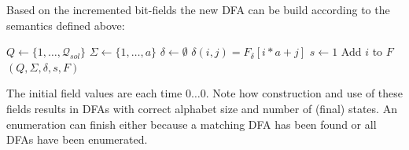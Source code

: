 Based on the incremented bit-fields the new DFA can be build according to the semantics defined above:
\vspace{0.2cm}
\begin{algorithmic}[1]
	\State $Q \gets \{1, \ldots, \mathcal{Q}_{sol}\}$
	\State $\Sigma \gets \{1, \ldots, a\}$
	\State $\delta \gets \emptyset$
            \State $\delta(i, j) = F_\delta[i * a + j]$
		\EndFor
	\EndFor
	\State $s \gets 1$
			\State Add $i$ to $F$
		\EndIf
	\EndFor
	\State \Return $(Q, \Sigma, \delta, s, F)$
	\EndFunction
\end{algorithmic}
\vspace{0.2cm}
The initial field values are each time $0\ldots 0$. Note how construction and use of these fields results in DFAs with correct alphabet size and number of (final) states. An enumeration can finish either because a matching DFA has been found or all DFAs have been enumerated.


